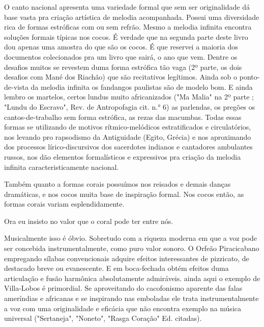 O canto nacional apresenta uma variedade formal que sem ser
originalidade dá base vasta pra criação artística de melodia
acompanhada. Possui uma diversidade rica de formas estróficas com ou sem
refrão. Mesmo a melodia infinita encontra soluções formais típicas nos
cocos. É verdade que na segunda parte deste livro dou apenas uma amostra
do que são os cocos. É que reservei a maioria dos documentos
colecionados pra um livro que sairá, o ano que vem. Dentre os desafios
muitos se revestem duma forma estrófica tão vaga (2º parte, os dois
desafios com Mané dos Riachão) que são recitativos legítimos. Ainda sob
o ponto-de-vista da melodia infinita os fandangos paulistas são de
modelo bom. E ainda lembro os martelos, certos lundus muito
africanizados ("Ma Malia" na 2º parte ; "Lundu do Escravo", Rev. de
Antropofagia cit. n.° 6) as parlendas, os pregões os cantos-de-trabalho
sem forma estrófica, as rezas das macumbas. Todas essas formas se
utilizando de motivos rítmico-melódicos estratificados e circulatórios,
nos levando pro rapsodismo da Antiguidade (Egito, Grécia) e nos
aproximando dos processos lírico-discursivos dos sacerdotes indianos e
cantadores ambulantes russos, nos dão elementos formalísticos e
expressivos pra criação da melodia infinita caracteristicamente
nacional.~

Também quanto a formas corais possuímos nos reisados e demais danças
dramáticas, e nos cocos muita base de inspiração formal. Nos cocos
então, as formas corais variam esplendidamente.

Ora eu insisto no valor que o coral pode ter entre nós.

Musicalmente isso é óbvio. Sobretudo com a riqueza moderna em que a voz
pode ser concebida instrumentalmente, como puro valor sonoro. O Orfeão
Piracicabano empregando sílabas convencionais adquire efeitos
interessantes de pizzicato, de destacado breve ou evanescente. E em
boca-fechada obtém efeitos duma articulação e fusão harmônica
absolutamente admiráveis. ainda aqui o exemplo de Villa-Lobos é
primordial. Se aproveitando do cacofonismo aparente das falas ameríndias
e africanas e se inspirando nas emboladas ele trata instrumentalmente a
voz com uma originalidade e eficácia que não encontra exemplo na música
universal ("Sertaneja", "Noneto", "Rasga Coração" Ed. citadas).

